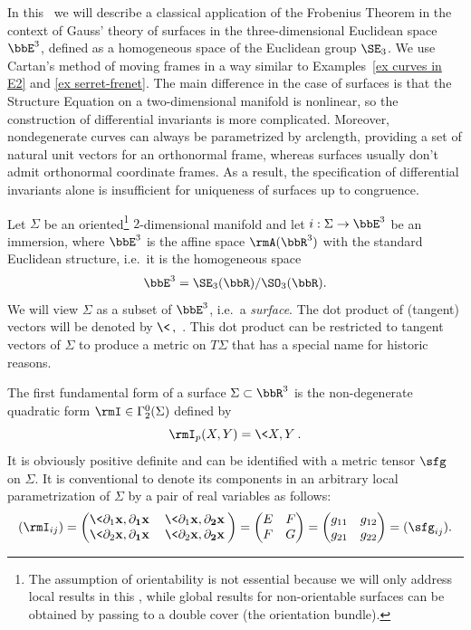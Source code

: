 In this \subsect\ we will describe a classical application of the Frobenius Theorem in the context of Gauss' theory of surfaces in the three-dimensional Euclidean space $\bbE^3$, defined as a homogeneous space of the Euclidean group $\SE_3$. We use Cartan's method of moving frames in a way similar to Examples~\ref{ex curves in E2} and \ref{ex serret-frenet}. The main difference in the case of surfaces is that the Structure Equation on a two-dimensional manifold is nonlinear, so the construction of differential invariants is more complicated. Moreover, nondegenerate curves can always be parametrized by arclength, providing a set of natural unit vectors for an orthonormal frame, whereas surfaces usually don't admit orthonormal coordinate frames. As a result, the specification of differential invariants alone is insufficient for uniqueness of surfaces up to congruence.


Let $\Sigma$ be an oriented\footnote{The assumption of orientability is not essential because we will only address local results in this \subsect, while global results for non-orientable surfaces can be obtained by passing to a double cover (the orientation bundle).} $2$-dimensional manifold and let $i:\Sigma\to \bbE^3$ be an immersion, where $\bbE^3$ is the affine space $\rmA(\bbR^3)$ with the standard Euclidean structure, i.e.\ it is the homogeneous space 
\[\bbE^3=\SE_3(\bbR)\slash \SO_3(\bbR).\]
We will view $\Sigma$ as a subset of $\bbE^3$, i.e.\ a \emph{surface}. The dot product of (tangent) vectors will be denoted by $\<\,,\,\>$. This dot product can be restricted to tangent vectors of $\Sigma$ to produce a metric on $T\Sigma$ that has a special name for historic reasons.

\begin{defn}
    The first fundamental form of a surface $\Sigma\subset\bbR^3$ is the non-degenerate quadratic form $\rmI\in\Gamma^0_2(\Sigma)$ defined by 
    \[\rmI_p(X,Y)=\<X,Y\>.\]
    It is obviously positive definite and can be identified with a metric tensor $\sfg$ on $\Sigma$. It is conventional to denote its components in an arbitrary local parametrization of $\Sigma$ by a pair of real variables as follows:
    \[(\rmI_{ij})=
    \begin{pmatrix}
        \<\partial_1\bf{x},\partial_1\bf{x}\> & \<\partial_1\bf{x},\partial_2\bf{x}\>\\
        \<\partial_2\bf{x},\partial_1\bf{x}\> & \<\partial_2\bf{x},\partial_2\bf{x}\>
    \end{pmatrix}
    =\begin{pmatrix}
        E&F\\
        F& G
    \end{pmatrix}=\begin{pmatrix}
        g_{11}&g_{12}\\
        g_{21}& g_{22}
    \end{pmatrix}=(\sfg_{ij}).\label{eq fff}\]
\end{defn}

